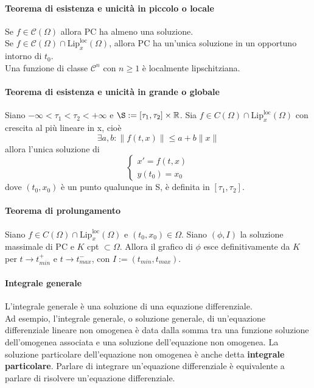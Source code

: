 \documentclass[a4paper,12pt]{article}
\newcommand{\cont}{\mathscr{C}}
\begin{document}
\paragraph{Teorema di esistenza e unicità in piccolo o locale}
Se $f \in \cont \left(\Omega\right)$ allora PC ha almeno una soluzione. \\
Se $f \in \cont \left(\Omega\right) \cap \text{Lip}^{\text{loc}}_x\left(\Omega\right)$, allora PC ha un'unica soluzione in un opportuno intorno di $t_0$.\\
Una funzione di classe $\cont^n$ con $ n \geq 1 $ è localmente lipschitziana. 

\paragraph{Teorema di esistenza e unicità in grande o globale}
Siano $-\infty < \tau_1 < \tau_2 < +\infty$ e $\S:=\left[\tau_1,\tau_2\right]\times\mathbb{R}$. Sia $f \in C\left(\Omega\right) \cap \text{Lip}^{\text{loc}}_x\left(\Omega\right)$ con crescita al più lineare in x, cioè
$$\exists a,b: \|f \left(t,x\right)\|\leq a + b\|x\|$$
allora l'unica soluzione di 
$$\begin{cases} x'=f\left(t,x\right) \\ y\left(t_0\right)=x_0 \end{cases}$$
dove $\left(t_0,x_0\right)$ è un punto qualunque in S, è definita in $\left[\tau_1,\tau_2\right]$.

\paragraph{Teorema di prolungamento}
Siano  $f \in C\left(\Omega\right) \cap \text{Lip}^{\text{loc}}_x\left(\Omega\right)$ e $\left(t_0,x_0\right) \in \Omega$. Siano $\left(\phi,I\right)$ la soluzione massimale di PC e $K$ cpt $\subset \Omega$. Allora il grafico di $\phi$ esce definitivamente da $K$ per $t\rightarrow t^+_{min}$ e $t\rightarrow t^-_{max}$, con $I:=(t_{min},t_{max})$.

\paragraph{Integrale generale}
L'integrale generale è una soluzione di una equazione differenziale.\\
Ad esempio, l'integrale generale, o soluzione generale, di un'equazione differenziale lineare non omogenea è data dalla somma tra una funzione soluzione dell'omogenea associata e una soluzione dell'equazione non omogenea. La soluzione particolare dell'equazione non omogenea è anche detta \textbf{integrale particolare}. Parlare di integrare un'equazione differenziale è equivalente a parlare di risolvere un'equazione differenziale.
\end{document}
